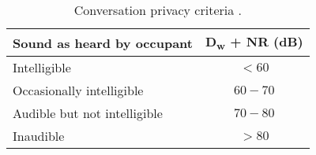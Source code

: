 \begin{table}[htbp]
	\caption{Conversation privacy criteria \citep{unit6}.}
	\label{tbl:privacy_criteria}
	\centering
	\begin{tabular}{@{}lc@{}}
		\toprule
		Sound as heard by occupant & D\textsubscript{w} + NR (dB) \\ \midrule
		Intelligible & $< 60$ \\
		Occasionally intelligible & $60 - 70$ \\
		Audible but not intelligible & $70 - 80$ \\
		Inaudible & $> 80$ \\ \bottomrule
	\end{tabular}
\end{table}